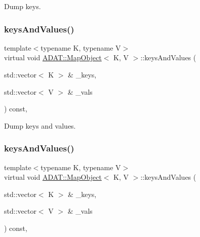 Dump keys. 

\mbox{\label{classADAT_1_1MapObject_ab19c1622f3edfd0755e42583e6a48844}} 
\subsubsection{\texorpdfstring{keysAndValues()}{keysAndValues()}\hspace{0.1cm}{\footnotesize\ttfamily [1/2]}}
{\footnotesize\ttfamily template$<$typename K, typename V$>$ \\
virtual void \mbox{\hyperlink{classADAT_1_1MapObject}{A\+D\+A\+T\+::\+Map\+Object}}$<$ K, V $>$\+::keys\+And\+Values (\begin{DoxyParamCaption}\item[{std\+::vector$<$ K $>$ \&}]{\+\_\+keys,  }\item[{std\+::vector$<$ V $>$ \&}]{\+\_\+vals }\end{DoxyParamCaption}) const\hspace{0.3cm}{\ttfamily [inline]}, {\ttfamily [virtual]}}



Dump keys and values. 

\mbox{\label{classADAT_1_1MapObject_ab19c1622f3edfd0755e42583e6a48844}} 
\subsubsection{\texorpdfstring{keysAndValues()}{keysAndValues()}\hspace{0.1cm}{\footnotesize\ttfamily [2/2]}}
{\footnotesize\ttfamily template$<$typename K, typename V$>$ \\
virtual void \mbox{\hyperlink{classADAT_1_1MapObject}{A\+D\+A\+T\+::\+Map\+Object}}$<$ K, V $>$\+::keys\+And\+Values (\begin{DoxyParamCaption}\item[{std\+::vector$<$ K $>$ \&}]{\+\_\+keys,  }\item[{std\+::vector$<$ V $>$ \&}]{\+\_\+vals }\end{DoxyParamCaption}) const\hspace{0.3cm}{\ttfamily [inline]}, {\ttfamily [virtual]}}



